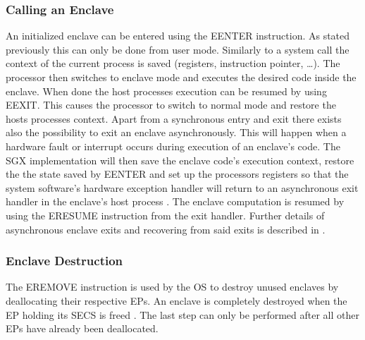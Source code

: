\subsubsection{Calling an Enclave}
An initialized enclave can be entered using the EENTER instruction. As stated previously this can only be done from user mode. Similarly to a system call the context of the current
process is saved (registers, instruction pointer, \dots). The processor then switches to enclave mode and executes the desired code inside the enclave. When done the host processes
execution can be resumed by using EEXIT. This causes the processor to switch to normal mode and restore the hosts processes context. Apart from a synchronous entry and exit there
exists also the possibility to exit an enclave asynchronously. This will happen when a hardware fault or interrupt occurs during execution of an enclave's code. The SGX
implementation will then save the enclave code's execution context, restore the the state saved by EENTER and set up the processors registers so that the system software’s hardware 
exception handler will return to an asynchronous exit handler in the enclave’s host process \cite{Costan2016IntelSE}. The enclave computation is resumed by using the ERESUME
instruction from the exit handler. Further details of asynchronous enclave exits and recovering from said exits is described in \cite{Costan2016IntelSE}.

\subsubsection{Enclave Destruction}
The EREMOVE instruction is used by the OS to destroy unused enclaves by deallocating their respective EPs. An enclave is completely destroyed when the EP holding its SECS is freed
\cite{Costan2016IntelSE}. The last step can only be performed after all other EPs have already been deallocated.